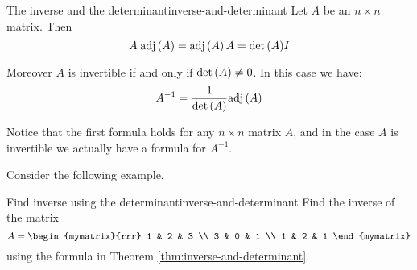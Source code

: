 \begin{theorem}{The inverse and the determinant}{inverse-and-determinant}
Let $A$ be an  $n\times n$ matrix. Then  
\begin{equation*}
A \; \mbox{\rm adj}\left(A\right) = \mbox{\rm adj}\left(A\right)A = {\det \left(A\right)} I
\end{equation*}

Moreover $A$ is invertible if and only if  $\det \left(A\right) \neq 0$. In this case we have: 
\begin{equation*}
A^{-1} = \frac{1}{\det \left(A\right)}  \mbox{\rm adj}\left(A\right)
\end{equation*}
\end{theorem}


Notice that the first formula holds for any $n \times n$ matrix $A$, and in the case $A$ is invertible we actually have a formula for $A^{-1}$.

Consider the following example.

\begin{example}{Find inverse using the determinant}{inverse-and-determinant}
Find the inverse of the matrix
\begin{equation*}
A=\begin{mymatrix}{rrr}
1 & 2 & 3 \\
3 & 0 & 1 \\
1 & 2 & 1
\end{mymatrix}
\end{equation*}
using the formula in Theorem \ref{thm:inverse-and-determinant}.
\end{example}

